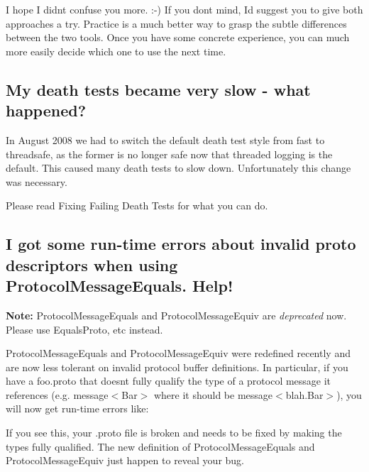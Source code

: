 I hope I didn\textquotesingle{}t confuse you more. \+:-\/) If you don\textquotesingle{}t mind, I\textquotesingle{}d suggest you to give both approaches a try. Practice is a much better way to grasp the subtle differences between the two tools. Once you have some concrete experience, you can much more easily decide which one to use the next time.

\subsection*{My death tests became very slow -\/ what happened?}

In August 2008 we had to switch the default death test style from {\ttfamily fast} to {\ttfamily threadsafe}, as the former is no longer safe now that threaded logging is the default. This caused many death tests to slow down. Unfortunately this change was necessary.

Please read Fixing Failing Death Tests for what you can do.

\subsection*{I got some run-\/time errors about invalid proto descriptors when using {\ttfamily Protocol\+Message\+Equals}. Help!}

{\bfseries{Note\+:}} {\ttfamily Protocol\+Message\+Equals} and {\ttfamily Protocol\+Message\+Equiv} are {\itshape deprecated} now. Please use {\ttfamily Equals\+Proto}, etc instead.

{\ttfamily Protocol\+Message\+Equals} and {\ttfamily Protocol\+Message\+Equiv} were redefined recently and are now less tolerant on invalid protocol buffer definitions. In particular, if you have a {\ttfamily foo.\+proto} that doesn\textquotesingle{}t fully qualify the type of a protocol message it references (e.\+g. {\ttfamily message$<$Bar$>$} where it should be {\ttfamily message$<$blah.\+Bar$>$}), you will now get run-\/time errors like\+:


\begin{DoxyCode}{0}
\DoxyCodeLine{... descriptor.cc:...] Invalid proto descriptor for file "path/to/foo.proto":}
\DoxyCodeLine{... descriptor.cc:...]  blah.MyMessage.my\_field: ".Bar" is not defined.}
\end{DoxyCode}


If you see this, your {\ttfamily .proto} file is broken and needs to be fixed by making the types fully qualified. The new definition of {\ttfamily Protocol\+Message\+Equals} and {\ttfamily Protocol\+Message\+Equiv} just happen to reveal your bug.

